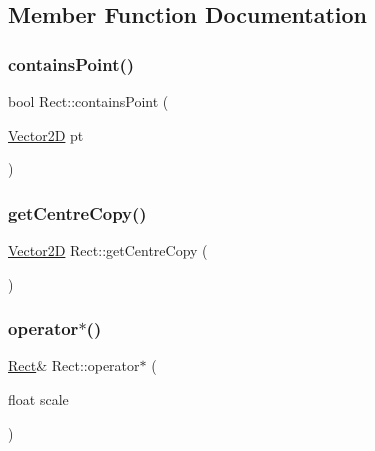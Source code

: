 \subsection{Member Function Documentation}
\hypertarget{class_rect_a81e3d93bf30b2b695058b774f42b4e76}{}\label{class_rect_a81e3d93bf30b2b695058b774f42b4e76} 
\subsubsection{\texorpdfstring{contains\+Point()}{containsPoint()}}
{\footnotesize\ttfamily bool Rect\+::contains\+Point (\begin{DoxyParamCaption}\item[{\hyperlink{class_vector2_d}{Vector2D}}]{pt }\end{DoxyParamCaption})\hspace{0.3cm}{\ttfamily [inline]}}

\hypertarget{class_rect_a50af4844d2bd0beb72b75a9890067e43}{}\label{class_rect_a50af4844d2bd0beb72b75a9890067e43} 
\subsubsection{\texorpdfstring{get\+Centre\+Copy()}{getCentreCopy()}}
{\footnotesize\ttfamily \hyperlink{class_vector2_d}{Vector2D} Rect\+::get\+Centre\+Copy (\begin{DoxyParamCaption}{ }\end{DoxyParamCaption})\hspace{0.3cm}{\ttfamily [inline]}}

\hypertarget{class_rect_a6e26d2923ad8159589fc12e7e857b21a}{}\label{class_rect_a6e26d2923ad8159589fc12e7e857b21a} 
\subsubsection{\texorpdfstring{operator$\ast$()}{operator*()}}
{\footnotesize\ttfamily \hyperlink{class_rect}{Rect}\& Rect\+::operator$\ast$ (\begin{DoxyParamCaption}\item[{float}]{scale }\end{DoxyParamCaption})\hspace{0.3cm}{\ttfamily [inline]}}

